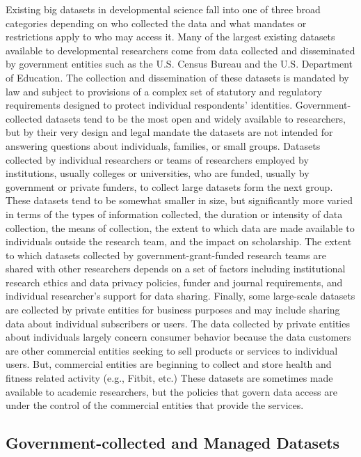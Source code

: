 \documentclass[letterpaper,man,apacite,natbib]{apa6}
\begin{document}
Existing big datasets in developmental science fall into one of three broad categories depending on who collected the data and what mandates or restrictions apply to who may access it.
Many of the largest existing datasets available to developmental researchers come from data collected and disseminated by government entities such as the U.S. Census Bureau and the U.S. Department of Education.
The collection and dissemination of these datasets is mandated by law and subject to provisions of a complex set of statutory and regulatory requirements designed to protect individual respondents' identities.
Government-collected datasets tend to be the most open and widely available to researchers, but by their very design and legal mandate the datasets are not intended for answering questions about individuals, families, or small groups.
Datasets collected by individual researchers or teams of researchers employed by institutions, usually colleges or universities, who are funded, usually by government or private funders, to collect large datasets form the next group.
These datasets tend to be somewhat smaller in size, but significantly more varied in terms of the types of information collected, the duration or intensity of data collection, the means of collection, the extent to which data are made available to individuals outside the research team, and the impact on scholarship.
The extent to which datasets collected by government-grant-funded research teams are shared with other researchers depends on a set of factors including institutional research ethics and data privacy policies, funder and journal requirements, and individual researcher's support for data sharing.
Finally, some large-scale datasets are collected by private entities for business purposes and may include sharing data about individual subscribers or users.
The data collected by private entities about individuals largely concern consumer behavior because the data customers are other commercial entities seeking to sell products or services to individual users.
But, commercial entities are beginning to collect and store health and fitness related activity (e.g., Fitbit, etc.) 
These datasets are sometimes made available to academic researchers, but the policies that govern data access are under the control of the commercial entities that provide the services.

\subsection{Government-collected and Managed Datasets}
\end{document}
